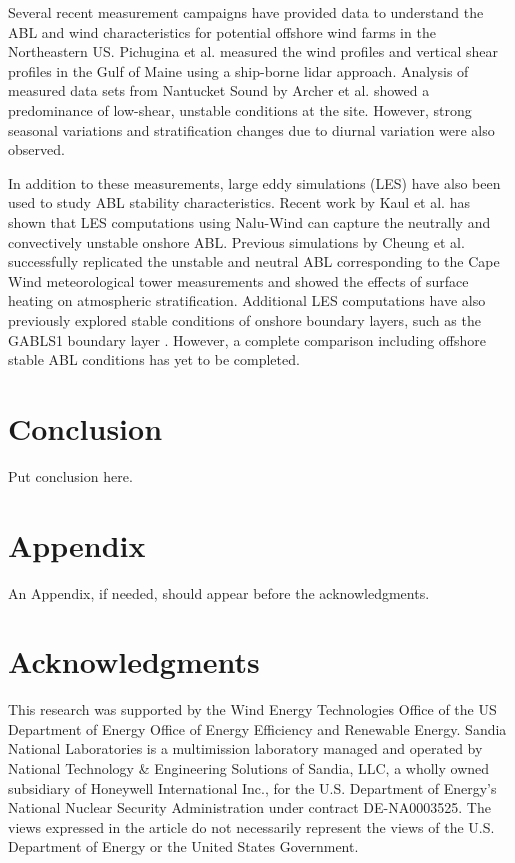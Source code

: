 \documentclass[conf]{new-aiaa}
\begin{document}
Several recent measurement campaigns have provided data to understand
the ABL and wind characteristics for potential offshore wind farms in
the Northeastern US.  Pichugina et al. \cite{pichugina2017properties}
measured the wind profiles and vertical shear profiles in the Gulf of
Maine using a ship-borne lidar approach.  Analysis of measured data
sets from Nantucket Sound by Archer et
al. \cite{archer2016predominance} showed a predominance of low-shear,
unstable conditions at the site.  However, strong seasonal variations
and stratification changes due to diurnal variation were also
observed.

In addition to these measurements, large eddy simulations (LES) have
also been used to study ABL stability characteristics.  Recent work by
Kaul et al. \cite{kaul2020large} has shown that LES computations using
Nalu-Wind can capture the neutrally and convectively unstable onshore
ABL.  Previous simulations by Cheung et al. \cite{cheung2020large}
successfully replicated the unstable and neutral ABL corresponding to
the Cape Wind meteorological tower measurements
\cite{archer2016predominance} and showed the effects of surface
heating on atmospheric stratification.  Additional LES computations
\cite{sullivan2016turbulent} have also previously explored stable
conditions of onshore boundary layers, such as the GABLS1 boundary
layer \cite{beare2006intercomparison}.  However, a complete comparison
including offshore stable ABL conditions has yet to be completed.





\section{Conclusion}
Put conclusion here.

\section*{Appendix}

An Appendix, if needed, should appear before the acknowledgments.

\section*{Acknowledgments}
This research was supported by the Wind Energy Technologies Office of
the US Department of Energy Office of Energy Efficiency and Renewable
Energy.  Sandia National Laboratories is a multimission laboratory
managed and operated by National Technology \& Engineering Solutions
of Sandia, LLC, a wholly owned subsidiary of Honeywell International
Inc., for the U.S. Department of Energy's National Nuclear Security
Administration under contract DE-NA0003525. The views expressed in the
article do not necessarily represent the views of the U.S. Department
of Energy or the United States Government.


% 

\end{document}
